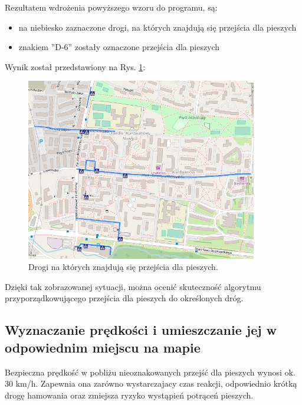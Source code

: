 Rezultatem wdrożenia powyższego wzoru do programu, są:
\begin{itemize}
\item na niebiesko zaznaczone drogi, na których znajdują się przejścia dla pieszych
\item znakiem ''D-6'' zostały oznaczone przejścia dla pieszych
\end{itemize}
Wynik został przedstawiony na Rys. \ref{sec:PrzejscieDrogi}:

\begin{figure}[h]
\caption{Drogi na których znajdują się przejścia dla pieszych.}
\label{sec:PrzejscieDrogi}
\centering
\includegraphics[width=0.9\textwidth]{PrzejscieDrogi}
\end{figure}

Dzięki tak zobrazowanej sytuacji, można ocenić skuteczność algorytmu przyporządkowującego przejścia dla pieszych do określonych dróg.

\subsection{Wyznaczanie prędkości i umieszczanie jej w odpowiednim miejscu na mapie}

Bezpieczna prędkość w pobliżu nieoznakowanych przejść dla pieszych wynosi ok. 30 km/h. Zapewnia ona zarówno wystarczajacy czas reakcji, odpowiednio krótką drogę hamowania oraz zmiejsza ryzyko wystąpień potrąceń pieszych.

